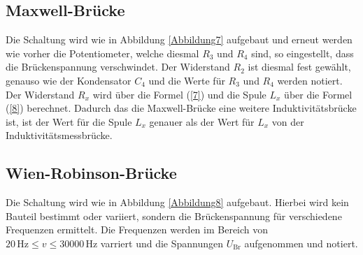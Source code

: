 \subsection{Maxwell-Brücke}

\begin{flushleft}
    Die Schaltung wird wie in Abbildung \ref{Abbildung7} aufgebaut und erneut werden wie vorher die Potentiometer, welche diesmal $R_{3}$ und $R_{4}$ sind, so eingestellt, dass die Brückenspannung verschwindet.
    Der Widerstand $R_{2} $ ist diesmal fest gewählt, genauso wie der Kondensator $C_{4}$ und die Werte für $R_{3}$ und $R_{4}$ werden notiert.
    Der Widerstand $R_{x}$ wird über die Formel (\ref{7}) und die Spule $L_{x}$ über die Formel (\ref{8}) berechnet.
    Dadurch das die Maxwell-Brücke eine weitere Induktivitätsbrücke ist, ist der Wert für die Spule $L_{x}$ genauer als der Wert für $L_{x}$ von der Induktivitätsmessbrücke.
\end{flushleft}

\subsection{Wien-Robinson-Brücke}

\begin{flushleft}
    Die Schaltung wird wie in Abbildung \ref{Abbildung8} aufgebaut.
    Hierbei wird kein Bauteil bestimmt oder variiert, sondern die Brückenspannung für verschiedene Frequenzen ermittelt.
    Die Frequenzen werden im Bereich von $ 20\,\unit{\hertz} \leq v \leq 30000\,\unit{\hertz} $ varriert und die Spannungen $U_{\text{Br}}$ aufgenommen und notiert. 
\end{flushleft}
